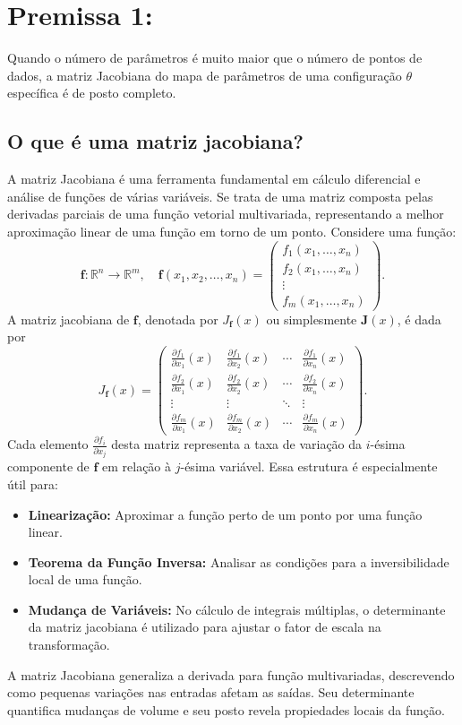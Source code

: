 \documentclass{article}
\begin{document}
\section{Premissa 1:}
Quando o número de parâmetros é muito maior que o número de pontos de dados, a matriz Jacobiana do mapa de parâmetros de uma configuração $\theta$ específica é de posto completo.
\subsection{O que é uma matriz jacobiana?}
A matriz Jacobiana é uma ferramenta fundamental em cálculo diferencial e análise de funções de várias variáveis. Se trata de uma matriz composta pelas derivadas parciais de uma função vetorial multivariada, representando a melhor aproximação linear de uma função em torno de um ponto.
Considere uma função:
\[
\mathbf{f} : \mathbb{R}^n \to \mathbb{R}^m, \quad 
\mathbf{f}(x_1, x_2, \dots, x_n) = \begin{pmatrix} 
f_1(x_1, \dots, x_n) \\[1ex] 
f_2(x_1, \dots, x_n) \\[1ex]
\vdots \\[1ex] 
f_m(x_1, \dots, x_n)
\end{pmatrix}.
\]
A matriz jacobiana de \(\mathbf{f}\), denotada por \(J_{\mathbf{f}}(x)\) ou simplesmente \(\mathbf{J}(x)\), é dada por
\[
J_{\mathbf{f}}(x) =
\begin{pmatrix}
\frac{\partial f_1}{\partial x_1}(x) & \frac{\partial f_1}{\partial x_2}(x) & \cdots & \frac{\partial f_1}{\partial x_n}(x) \\[1ex]
\frac{\partial f_2}{\partial x_1}(x) & \frac{\partial f_2}{\partial x_2}(x) & \cdots & \frac{\partial f_2}{\partial x_n}(x) \\[1ex]
\vdots & \vdots & \ddots & \vdots \\[1ex]
\frac{\partial f_m}{\partial x_1}(x) & \frac{\partial f_m}{\partial x_2}(x) & \cdots & \frac{\partial f_m}{\partial x_n}(x)
\end{pmatrix}.
\]
Cada elemento \(\frac{\partial f_i}{\partial x_j}\) desta matriz representa a taxa de variação da \(i\)-ésima componente de \(\mathbf{f}\) em relação à \(j\)-ésima variável. Essa estrutura é especialmente útil para:
\begin{itemize}
    \item \textbf{Linearização:} Aproximar a função perto de um ponto por uma função linear.
    \item \textbf{Teorema da Função Inversa:} Analisar as condições para a inversibilidade local de uma função.
    \item \textbf{Mudança de Variáveis:} No cálculo de integrais múltiplas, o determinante da matriz jacobiana é utilizado para ajustar o fator de escala na transformação.
\end{itemize}
A matriz Jacobiana generaliza a derivada para função multivariadas, descrevendo como pequenas variações nas
entradas afetam as saídas. Seu determinante quantifica mudanças de volume e seu posto revela propiedades locais da função.
\end{document}
